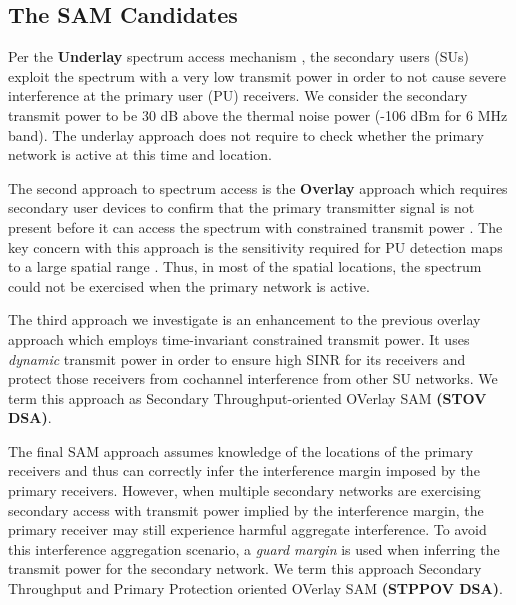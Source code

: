 \documentclass[journal,12pt,draftclsnofoot,onecolumn]{IEEEtran}
\newcommand{\mycomment}[1]{}
\begin{document}
\subsection{The SAM Candidates}

Per the \textbf{Underlay} spectrum access mechanism \cite{dsa_survey}, the secondary users (SUs) exploit the spectrum with a very low transmit power in order to not cause severe interference at the primary user (PU) receivers. We consider the secondary transmit power to be 30 dB above the thermal noise power (-106 dBm for 6 MHz band). The underlay approach does not require to check whether the primary network is active at this time and location.

The second approach to spectrum access is the \textbf{Overlay} approach which requires secondary user devices to confirm that the primary transmitter signal is not present before it can access the spectrum with constrained transmit power \cite{dsa_survey}. The key concern with this approach is the sensitivity required for PU detection maps to a large spatial range \cite{oms2_sca}. Thus, in most of the spatial locations, the spectrum could not be exercised when the primary network is active.  

The third approach we investigate is an enhancement to the previous overlay approach which employs time-invariant constrained transmit power. It uses \textit{dynamic} transmit power in order to ensure high SINR for its receivers and protect those receivers from cochannel interference from other SU networks. \mycomment{It however cannot ensure non-harmful interference to the primary network users that are just beyond the sensing range of the secondary user network due to interference aggregation effect.} We term this approach as Secondary Throughput-oriented OVerlay SAM \textbf{(STOV DSA)}.

The final SAM approach assumes knowledge of the locations of the primary receivers and thus can correctly infer the interference margin imposed by the primary receivers. However, when multiple secondary networks are exercising secondary access with transmit power implied by the interference margin, the primary receiver may still experience harmful aggregate interference. To avoid this interference aggregation scenario, a \textit{guard margin} is used when inferring the transmit power for the secondary network.  We term this approach Secondary Throughput and Primary Protection oriented OVerlay SAM \textbf{(STPPOV DSA)}.
\end{document}
